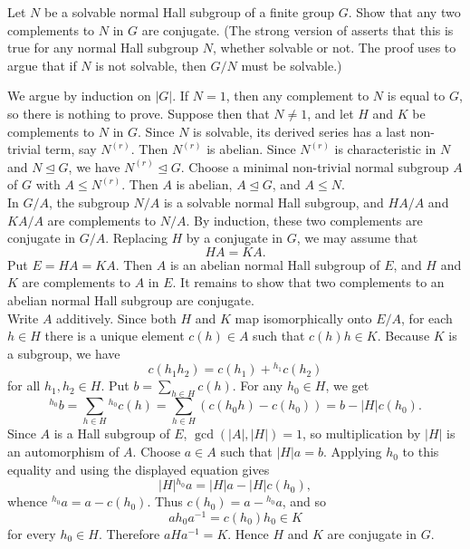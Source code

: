 \documentclass[../Odyssey_Project.tex]{subfiles}
\begin{document}
\begin{exercise}
\label{ex:11.2}
Let $N$ be a solvable normal Hall subgroup of a finite group $G$. Show that any two complements to $N$ in $G$ are conjugate. (The strong version of  asserts that this is true for any normal Hall subgroup $N$, whether solvable or not. The proof uses  to argue that if $N$ is not solvable, then $G/N$ must be solvable.)
\end{exercise}
\begin{solution}
    We argue by induction on $\lvert G\rvert$. If $N=1$, then any complement to $N$ is equal to $G$, so there is nothing to prove. Suppose then that $N\neq 1$, and let $H$ and $K$ be complements to $N$ in $G$. Since $N$ is solvable, its derived series has a last non-trivial term, say $N^{(r)}$. Then $N^{(r)}$ is abelian. Since $N^{(r)}$ is characteristic in $N$ and $N\trianglelefteq G$, we have $N^{(r)}\trianglelefteq G$. Choose a minimal non-trivial normal subgroup $A$ of $G$ with $A\leq N^{(r)}$. Then $A$ is abelian, $A\trianglelefteq G$, and $A\leq N$.\\
    In $G/A$, the subgroup $N/A$ is a solvable normal Hall subgroup, and $HA/A$ and $KA/A$ are complements to $N/A$. By induction, these two complements are conjugate in $G/A$. Replacing $H$ by a conjugate in $G$, we may assume that
    \[
        HA=KA.
    \]
    Put $E=HA=KA$. Then $A$ is an abelian normal Hall subgroup of $E$, and $H$ and $K$ are complements to $A$ in $E$. It remains to show that two complements to an abelian normal Hall subgroup are conjugate.\\
    Write $A$ additively. Since both $H$ and $K$ map isomorphically onto $E/A$, for each $h\in H$ there is a unique element $c(h)\in A$ such that $c(h)h\in K$. Because $K$ is a subgroup, we have
    \[
        c(h_1h_2)=c(h_1)+{}^{h_1}c(h_2)
    \]
    for all $h_1,h_2\in H$. Put $b=\sum_{h\in H}c(h)$. For any $h_0\in H$, we get
    \[
        {}^{h_0}b
        =\sum_{h\in H}{}^{h_0}c(h)
        =\sum_{h\in H}(c(h_0h)-c(h_0))
        =b-\lvert H\rvert c(h_0).
    \]
    Since $A$ is a Hall subgroup of $E$, $\gcd(\lvert A\rvert,\lvert H\rvert)=1$, so multiplication by $\lvert H\rvert$ is an automorphism of $A$. Choose $a\in A$ such that $\lvert H\rvert a=b$. Applying $h_0$ to this equality and using the displayed equation gives
    \[
        \lvert H\rvert{}^{h_0}a=\lvert H\rvert a-\lvert H\rvert c(h_0),
    \]
    whence ${}^{h_0}a=a-c(h_0)$. Thus $c(h_0)=a-{}^{h_0}a$, and so
    \[
        ah_0a^{-1}=c(h_0)h_0\in K
    \]
    for every $h_0\in H$. Therefore $aHa^{-1}=K$. Hence $H$ and $K$ are conjugate in $G$.
\end{solution}
\end{document}
